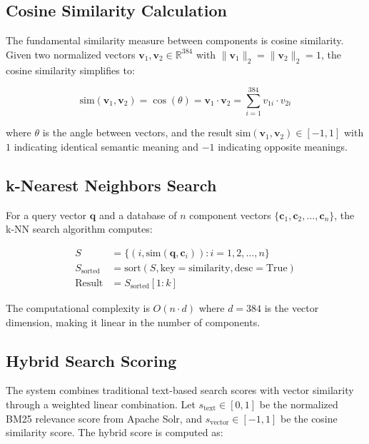 \documentclass[rnd]{mas_proposal}
\begin{document}
\subsection{Cosine Similarity Calculation}

The fundamental similarity measure between components is cosine similarity. Given two normalized vectors $\mathbf{v}_1, \mathbf{v}_2 \in \mathbb{R}^{384}$ with $\|\mathbf{v}_1\|_2 = \|\mathbf{v}_2\|_2 = 1$, the cosine similarity simplifies to:

\begin{equation}
\text{sim}(\mathbf{v}_1, \mathbf{v}_2) = \cos(\theta) = \mathbf{v}_1 \cdot \mathbf{v}_2 = \sum_{i=1}^{384} v_{1i} \cdot v_{2i} \label{eq:cosine_similarity}
\end{equation}

where $\theta$ is the angle between vectors, and the result $\text{sim}(\mathbf{v}_1, \mathbf{v}_2) \in [-1, 1]$ with $1$ indicating identical semantic meaning and $-1$ indicating opposite meanings.

\subsection{k-Nearest Neighbors Search}

For a query vector $\mathbf{q}$ and a database of $n$ component vectors $\{\mathbf{c}_1, \mathbf{c}_2, \ldots, \mathbf{c}_n\}$, the k-NN search algorithm computes:

\begin{align}
S &= \{(i, \text{sim}(\mathbf{q}, \mathbf{c}_i)) : i = 1, 2, \ldots, n\} \label{eq:similarity_set}\\
S_{\text{sorted}} &= \text{sort}(S, \text{key}=\text{similarity}, \text{desc}=\text{True}) \label{eq:sorting}\\
\text{Result} &= S_{\text{sorted}}[1:k] \label{eq:top_k}
\end{align}

The computational complexity is $O(n \cdot d)$ where $d = 384$ is the vector dimension, making it linear in the number of components.

\subsection{Hybrid Search Scoring}

The system combines traditional text-based search scores with vector similarity through a weighted linear combination. Let $s_{\text{text}} \in [0, 1]$ be the normalized BM25 relevance score from Apache Solr, and $s_{\text{vector}} \in [-1, 1]$ be the cosine similarity score. The hybrid score is computed as:
\end{document}
